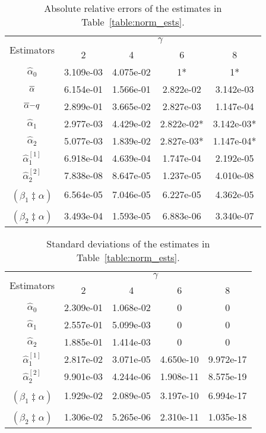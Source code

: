 \begin{table}[H]
\centering
\begin{tabular}{ccccc}
\toprule
\multirow{2}{*}{Estimators} & \multicolumn{4}{c}{$\gamma$} \\
                            & 2    & 4    & 6    & 8    \\ 
\midrule
$\hat{\alpha}_0$ & 3.109e-03 & 4.075e-02 & 1* & 1* \\
\rowcolor{Gray} $\overline{\alpha}$ & 6.154e-01 & 1.566e-01 & 2.822e-02 & 3.142e-03 \\
$\overline{\alpha}{-}q$ & 2.899e-01 & 3.665e-02 & 2.827e-03 & 1.147e-04 \\
\rowcolor{Gray} $\hat{\alpha}_1$ & 2.977e-03 & 4.429e-02 & 2.822e-02* & 3.142e-03* \\
$\hat{\alpha}_2$ & 5.077e-03 & 1.839e-02 & 2.827e-03* & 1.147e-04* \\
\rowcolor{Gray} $\hat{\alpha}_1^{[1]}$ & 6.918e-04 & 4.639e-04 & 1.747e-04 & 2.192e-05 \\
$\hat{\alpha}_2^{[2]}$ & 7.838e-08 & 8.647e-05 & 1.237e-05 & 4.010e-08 \\
\rowcolor{Gray} $\widehat{(\beta_1 \ddagger \alpha)}$ & 6.564e-05 & 7.046e-05 & 6.227e-05 & 4.362e-05 \\
$\widehat{(\beta_2 \ddagger \alpha)}$ & 3.493e-04 & 1.593e-05 & 6.883e-06 & 3.340e-07 \\
\bottomrule
\end{tabular}
\caption{Absolute relative errors of the estimates in Table~\ref{table:norm_ests}.}
\end{table}

\vspace{-2em}

\begin{table}[H]
\centering
\begin{tabular}{ccccc}
\toprule
\multirow{2}{*}{Estimators} & \multicolumn{4}{c}{$\gamma$} \\
                            & 2    & 4    & 6    & 8    \\ 
\midrule
$\hat{\alpha}_0$ & 2.309e-01 & 1.068e-02 & 0 & 0 \\
\rowcolor{Gray} $\hat{\alpha}_1$ & 2.557e-01 & 5.099e-03 & 0 & 0 \\
$\hat{\alpha}_2$ & 1.885e-01 & 1.414e-03 & 0 & 0 \\
\rowcolor{Gray} $\hat{\alpha}_1^{[1]}$ & 2.817e-02 & 3.071e-05 & 4.650e-10 & 9.972e-17 \\
$\hat{\alpha}_2^{[2]}$ & 9.901e-03 & 4.244e-06 & 1.908e-11 & 8.575e-19 \\
\rowcolor{Gray} $\widehat{(\beta_1 \ddagger \alpha)}$ & 1.929e-02 & 2.089e-05 & 3.197e-10 & 6.994e-17 \\
$\widehat{(\beta_2 \ddagger \alpha)}$ & 1.306e-02 & 5.265e-06 & 2.310e-11 & 1.035e-18 \\
\bottomrule
\end{tabular}
\caption{Standard deviations of the estimates in Table~\ref{table:norm_ests}.}
\end{table}


